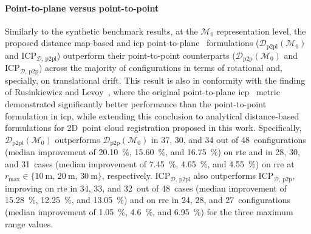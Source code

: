 \paragraph{Point-to-plane versus point-to-point}
Similarly to the synthetic benchmark results, at the $\mathcal{M}_0$
representation level, the proposed distance map-based and \gls{icp}
point-to-plane~\cite{chen-medioni:icra:1991} formulations
($\mathcal{D}_\mathrm{p2pl}(\mathcal{M}_0)$ and
$\mathrm{ICP}_{\mathcal{D},\,\mathrm{p2pl}}$) outperform their point-to-point
counterparts ($\mathcal{D}_\mathrm{p2p}(\mathcal{M}_0)$
and $\mathrm{ICP}_{\mathcal{D},\,\mathrm{p2p}}$) across the majority of
configurations in terms of rotational and, specially, on translational drift.
This result is also in conformity with the finding of Rusinkiewicz and
Levoy~\cite{rusinkiewicz-levoy:im:2001}, where the original point-to-plane
\gls{icp}~\cite{chen-medioni:icra:1991} metric demonstrated significantly
better performance than the point-to-point~\cite{besl-mckay:tpami:1992}
formulation in \gls{icp}, while extending this conclusion to analytical
distance-based formulations for 2D~point cloud registration proposed in this
work. Specifically, $\mathcal{D}_\mathrm{p2pl}(\mathcal{M}_0)$ outperforms
$\mathcal{D}_\mathrm{p2p}(\mathcal{M}_0)$ in
37, 30, and 34 out of 48~configurations
(median improvement of \SI{20.10}{\percent}, \SI{15.60}{\percent}, and
\SI{16.75}{\percent}) on \gls{rte}
and in 28, 30, and 31~cases
(median improvement of \SI{7.45}{\percent}, \SI{4.65}{\percent}, and
\SI{4.55}{\percent}) on \gls{rre}
at $r_\mathrm{max} \in \{\SI{10}{\metre},\,\SI{20}{\metre},\,\SI{30}{\metre}\}$,
respectively.
$\mathrm{ICP}_{\mathcal{D},\,\mathrm{p2pl}}$ also outperforms
$\mathrm{ICP}_{\mathcal{D},\,\mathrm{p2p}}$, improving on \gls{rte} in
34, 33, and 32~out of 48~cases
(median improvement of \SI{15.28}{\percent}, \SI{12.25}{\percent}, and
\SI{13.05}{\percent}) and on \gls{rre} in 24, 28, and 27~configurations
(median improvement of \SI{1.05}{\percent}, \SI{4.6}{\percent}, and
\SI{6.95}{\percent}) for the three maximum range values.

\clearpage








